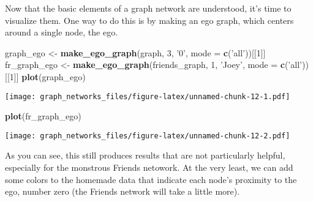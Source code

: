 \documentclass[]{article}
\newenvironment{Shaded}{\begin{snugshade}}{\end{snugshade}}
\newcommand{\KeywordTok}[1]{\textcolor[rgb]{0.13,0.29,0.53}{\textbf{#1}}}
\newcommand{\DataTypeTok}[1]{\textcolor[rgb]{0.13,0.29,0.53}{#1}}
\newcommand{\DecValTok}[1]{\textcolor[rgb]{0.00,0.00,0.81}{#1}}
\newcommand{\StringTok}[1]{\textcolor[rgb]{0.31,0.60,0.02}{#1}}
\newcommand{\OperatorTok}[1]{\textcolor[rgb]{0.81,0.36,0.00}{\textbf{#1}}}
\newcommand{\NormalTok}[1]{#1}
\begin{document}
Now that the basic elements of a graph network are understood, it's time
to visualize them. One way to do this is by making an ego graph, which
centers around a single node, the ego.

\begin{Shaded}
\begin{Highlighting}[]
\NormalTok{graph_ego <-}\StringTok{ }\KeywordTok{make_ego_graph}\NormalTok{(graph, }\DecValTok{3}\NormalTok{, }\StringTok{'0'}\NormalTok{, }\DataTypeTok{mode =} \KeywordTok{c}\NormalTok{(}\StringTok{'all'}\NormalTok{))[[}\DecValTok{1}\NormalTok{]]}
\NormalTok{fr_graph_ego <-}\StringTok{ }\KeywordTok{make_ego_graph}\NormalTok{(friends_graph, }\DecValTok{1}\NormalTok{, }\StringTok{'Joey'}\NormalTok{, }\DataTypeTok{mode =} \KeywordTok{c}\NormalTok{(}\StringTok{'all'}\NormalTok{))[[}\DecValTok{1}\NormalTok{]]}
\KeywordTok{plot}\NormalTok{(graph_ego)}
\end{Highlighting}
\end{Shaded}

\texttt{[image: graph\_networks\_files/figure-latex/unnamed-chunk-12-1.pdf]}

\begin{Shaded}
\begin{Highlighting}[]
\KeywordTok{plot}\NormalTok{(fr_graph_ego)}
\end{Highlighting}
\end{Shaded}

\texttt{[image: graph\_networks\_files/figure-latex/unnamed-chunk-12-2.pdf]}

As you can see, this still produces results that are not particularly
helpful, especially for the monstrous Friends netowork. At the very
least, we can add some colors to the homemade data that indicate each
node's proximity to the ego, number zero (the Friends network will take
a little more).

\begin{Shaded}
\end{Shaded}
\end{document}

